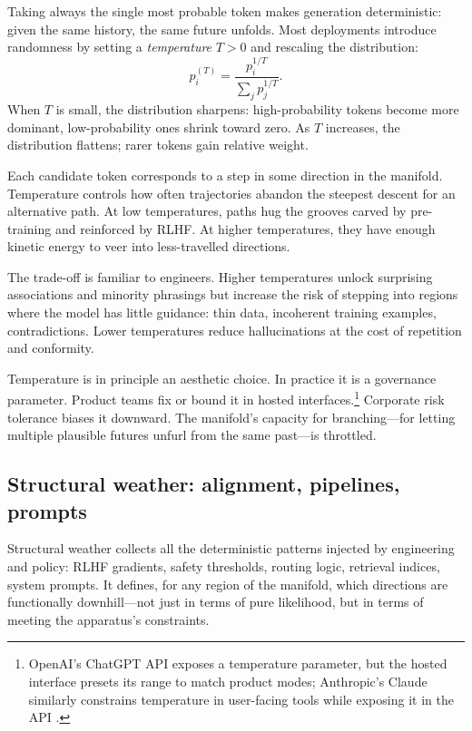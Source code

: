 \documentclass[12pt,a4paper]{article}
\begin{document}
Taking always the single most probable token makes generation deterministic: given the same history, the same future unfolds. Most deployments introduce randomness by setting a \emph{temperature} $T > 0$ and rescaling the distribution:
\[
p_i^{(T)} = \frac{p_i^{1/T}}{\sum_j p_j^{1/T}}.
\]
When $T$ is small, the distribution sharpens: high-probability tokens become more dominant, low-probability ones shrink toward zero. As $T$ increases, the distribution flattens; rarer tokens gain relative weight.

Each candidate token corresponds to a step in some direction in the manifold. Temperature controls how often trajectories abandon the steepest descent for an alternative path. At low temperatures, paths hug the grooves carved by pre-training and reinforced by RLHF. At higher temperatures, they have enough kinetic energy to veer into less-travelled directions.

The trade-off is familiar to engineers. Higher temperatures unlock surprising associations and minority phrasings but increase the risk of stepping into regions where the model has little guidance: thin data, incoherent training examples, contradictions. Lower temperatures reduce hallucinations at the cost of repetition and conformity.

Temperature is in principle an aesthetic choice. In practice it is a governance parameter. Product teams fix or bound it in hosted interfaces.\footnote{OpenAI's ChatGPT API exposes a temperature parameter, but the hosted interface presets its range to match product modes; Anthropic's Claude similarly constrains temperature in user-facing tools while exposing it in the API \cite{openai_api,anthropic_docs}.} Corporate risk tolerance biases it downward. The manifold's capacity for branching---for letting multiple plausible futures unfurl from the same past---is throttled.

\subsection{Structural weather: alignment, pipelines, prompts}

Structural weather collects all the deterministic patterns injected by engineering and policy: RLHF gradients, safety thresholds, routing logic, retrieval indices, system prompts. It defines, for any region of the manifold, which directions are functionally downhill---not just in terms of pure likelihood, but in terms of meeting the apparatus's constraints.
\end{document}

